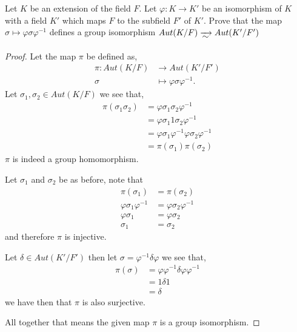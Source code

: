 \documentclass[11pt]{article}
\newenvironment{problem}[2][Problem\!]{\begin{tcolorbox}\begin{trivlist}
\item[\hskip \labelsep {\bfseries #1}\hskip \labelsep {\bfseries #2}]}{\end{trivlist}\end{tcolorbox}}
\newcommand*\MapsTo{%
  \xrightarrow[\raisebox{0.2 em}{\smash{\ensuremath{\sim}}}]{}%
}
\renewcommand{\phi}{\varphi}
\begin{document}
\vspace*{20pt}
\begin{problem}{14.1.10}
  Let $K$ be an extension of the field $F$. Let $\phi: K \to K'$ be an isomorphism of $K$ with a field $K'$ which maps $F$ to the subfield $F'$ of $K'$. Prove that the map $\sigma \mapsto \phi\sigma\phi^{-1}$ defines a group isomorphism $Aut(K/F)\MapsTo Aut(K'/F')$
\end{problem}
\begin{proof}
  
  Let the map $\pi$ be defined as,
  \begin{align*}
    \pi: Aut(K/F) &\to Aut(K'/F') \\
        \sigma &\mapsto  \phi \sigma \phi^{-1}.
  \end{align*}
  Let $\sigma_1,\sigma_2 \in Aut(K/F)$ we see that,
  \begin{align*}
    \pi(\sigma_1\sigma_2) &= \phi \sigma_1\sigma_2 \phi^{-1}  \\
    &= \phi \sigma_1 1\sigma_2\phi^{-1} \\
    &= \phi\sigma_1 \phi^{-1}\phi \sigma_2 \phi^{-1} \\
    &= \pi(\sigma_1)\pi(\sigma_2) 
  \end{align*}
  $\pi$ is indeed a group homomorphism. 

  Let $\sigma_1$ and $\sigma_2$ be as before, note that
  \begin{align*}
    \pi(\sigma_1) &= \pi(\sigma_2)  \\
    \phi\sigma_1 \phi^{-1} &= \phi\sigma_2 \phi^{-1}  \\
    \phi \sigma_1 &= \phi \sigma_2 \\
    \sigma_1 &= \sigma_2
  \end{align*}
  and therefore $\pi$ is injective. 

  Let $\delta \in Aut(K'/F')$ then let $\sigma = \phi^{-1}\delta\phi$ we see that,
  \begin{align*}
    \pi(\sigma) &= \phi\phi^{-1}\delta \phi\phi^{-1} \\
    &= 1 \delta 1 \\
    &= \delta
  \end{align*}
  we have then that $\pi$ is also surjective.

  All together that means the given map $\pi$ is a group isomorphism. 
\end{proof}
\end{document}
